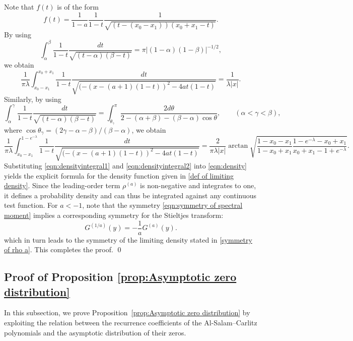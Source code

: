 \documentclass{amsart}
\theoremstyle{plain}
\theoremstyle{remark}
\newcommand{\abs}[1]{\lvert#1\rvert}
\numberwithin{equation}{section}
\begin{document}
Note that $f(t)$ is of the form
\begin{equation*}
    f(t)=\frac{1}{1-a}\frac{1}{1-t}\frac{1}{\sqrt{(t-(x_0-x_1))(x_0+x_1-t)}}.
\end{equation*}
By using  
\begin{equation*}
    \int_{\alpha}^{\beta}\frac{1}{1-t}\frac{dt}{\sqrt{(t-\alpha)(\beta-t)}}=\pi\abs{(1-\alpha)(1-\beta)}^{-1/2},
\end{equation*}
we obtain
\begin{equation}\label{eqn:densityintegral1}
    \frac{1}{\pi\lambda}\int_{x_0-x_1}^{x_0+x_1}\frac{1}{1-t}\frac{dt }{\sqrt{(-(x-(a+1)(1-t))^2-4at(1-t)}}=\frac{1}{\lambda\abs{x}}.
\end{equation}
Similarly, by using
\begin{equation*}
    \int_{\alpha}^{\gamma}\frac{1}{1-t}\frac{dt}{\sqrt{(t-\alpha)(\beta-t)}}=\int_{\theta_{\gamma}}^{\pi}\frac{2 d\theta}{2-({\alpha+\beta})-({\beta-\alpha})\cos\theta},\qquad (\alpha<\gamma<\beta), 
\end{equation*}
where $\cos\theta_{\gamma}=(2\gamma-\alpha-\beta)/(\beta-\alpha)$, we obtain
\begin{equation}\label{eqn:densityintegral2}
    \frac{1}{\pi\lambda}\int_{x_0-x_1}^{1-e^{-\lambda}}\frac{1}{1-t}\frac{dt }{\sqrt{(-(x-(a+1)(1-t))^2-4at(1-t)}}
    = \frac{2}{\pi\lambda\abs{x}}\arctan{\sqrt{\frac{1-x_0-x_1}{1-x_0+x_1}\frac{1-e^{-\lambda}-x_0+x_1}{x_0+x_1-1+e^{-\lambda}}}}.
\end{equation}
Substituting \eqref{eqn:densityintegral1} and \eqref{eqn:densityintegral2} into \eqref{eqn:density} yields the explicit formula for the density function given in \eqref{def of limiting density}. Since the leading-order term $\rho^{(a)}$ is non-negative and integrates to one, it defines a probability density and can thus be integrated against any continuous test function.
For $a<-1$,  note that the symmetry \eqref{eqn:symmetry of spectral moment} implies a corresponding symmetry for the Stieltjes transform:
\begin{equation}
    G^{(1/a)}(y)=-\frac{1}{a}G^{(a)}(y).
\end{equation}
which in turn leads to the symmetry of the limiting density stated in \eqref{symmetry of rho a}. This completes the proof. \qed





\subsection{Proof of Proposition \ref{prop:Asymptotic zero distribution}}
In this subsection, we prove Proposition~\ref{prop:Asymptotic zero distribution} by exploiting the relation between the recurrence coefficients of the Al-Salam--Carlitz polynomials and the asymptotic distribution of their zeros. 
\end{document}
